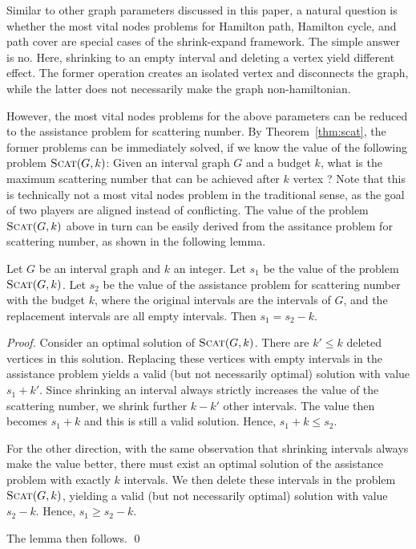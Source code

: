 Similar to other graph parameters discussed in this paper, a natural question is whether the most vital nodes problems for Hamilton path, Hamilton cycle, and path cover are special cases of the shrink-expand framework.
The simple answer is no.
Here, shrinking to an empty interval and deleting a vertex yield different effect.
The former operation creates an isolated vertex and disconnects the graph, while the latter does not necessarily make the graph non-hamiltonian.

However, the most vital nodes problems for the above parameters can be reduced to the assistance problem for scattering number.
By Theorem~\ref{thm:scat}, the former problems can be immediately solved, if we know the value of the following problem $\textsc{Scat}(G,k)$: Given an interval graph $G$ and a budget $k$, what is the maximum scattering number that can be achieved after $k$ vertex ?
Note that this is technically not a most vital nodes problem in the traditional sense, as the goal of two players are aligned instead of conflicting.
The value of the problem $\textsc{Scat}(G,k)$ above in turn can be easily derived from the assitance problem for scattering number, as shown in the following lemma.

\begin{lemma}
Let $G$ be an interval graph and $k$ an integer.
Let $s_1$ be the value of the problem $\textsc{Scat}(G,k)$.
Let $s_2$ be the value of the assistance problem for scattering number with the budget $k$, where the original intervals are the intervals of $G$, and the replacement intervals are all empty intervals.
Then $s_1 = s_2 - k$.
\end{lemma}
\begin{proof}
Consider an optimal solution of $\textsc{Scat}(G,k)$.
There are $k' \leq k$ deleted vertices in this solution.
Replacing these vertices with empty intervals in the assistance problem yields a valid (but not necessarily optimal) solution with value $s_1 + k'$.
Since shrinking an interval always strictly increases the value of the scattering number, we shrink further $k - k'$ other intervals.
The value then becomes $s_1 + k$ and this is still a valid solution.
Hence, $s_1 + k \leq s_2$.

For the other direction, with the same observation that shrinking intervals always make the value better, there must exist an optimal solution of the assistance problem with exactly $k$  intervals.
We then delete these intervals in the problem $\textsc{Scat}(G,k)$, yielding a valid (but not necessarily optimal) solution with value $s_2 - k$.
Hence, $s_1 \geq s_2 - k$.

The lemma then follows. 
\qed
\end{proof}


